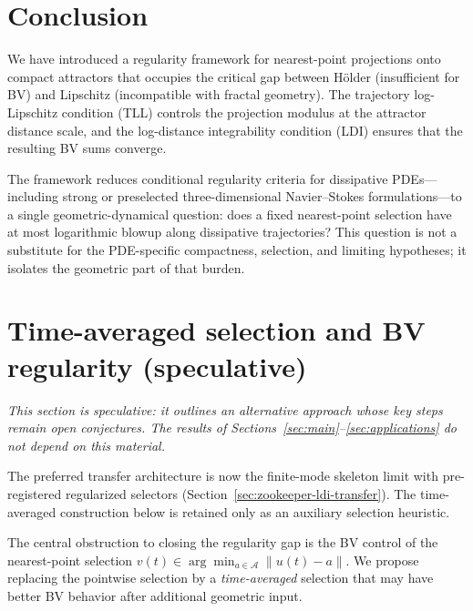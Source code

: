 \documentclass[12pt,a4paper]{article}
\theoremstyle{definition}
\theoremstyle{plain}
\theoremstyle{remark}
\begin{document}
\section{Conclusion}

We have introduced a regularity framework for nearest-point
projections onto compact attractors that occupies the critical
gap between Hölder (insufficient for BV) and Lipschitz
(incompatible with fractal geometry).  The trajectory log-Lipschitz
condition (TLL) controls the projection modulus at the attractor
distance scale, and the log-distance integrability condition (LDI)
ensures that the resulting BV sums converge.

The framework reduces conditional regularity criteria for
dissipative PDEs---including strong or preselected
three-dimensional Navier--Stokes formulations---to a single
geometric-dynamical question: does a fixed nearest-point selection
have at most logarithmic blowup along dissipative trajectories?
This question is not a substitute for the PDE-specific compactness,
selection, and limiting hypotheses; it isolates the geometric part of
that burden.


\section{Time-averaged selection and BV regularity (speculative)}
\label{sec:time-averaged}

\emph{This section is speculative: it outlines an alternative approach
whose key steps remain open conjectures.  The results of
Sections~\ref{sec:main}--\ref{sec:applications} do not depend on
this material.}

\medskip

The preferred transfer architecture is now the finite-mode skeleton
limit with pre-registered regularized selectors
(Section~\ref{sec:zookeeper-ldi-transfer}).  The time-averaged
construction below is retained only as an auxiliary selection
heuristic.

\medskip

The central obstruction to closing the regularity gap is the BV
control of the nearest-point selection
$v(t) \in \arg\min_{a \in \mathcal{A}} \|u(t) - a\|$.  We propose
replacing the pointwise selection by a \emph{time-averaged} selection
that may have better BV behavior after additional geometric input.
\end{document}

